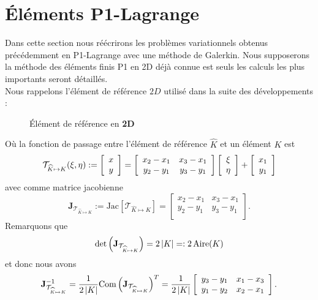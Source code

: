 
\section{Éléments P1-Lagrange}
\noindent Dans cette section nous réécrirons les problèmes variationnels obtenus précédemment en P1-Lagrange avec une méthode de Galerkin. Nous supposerons la méthode des éléments finis P1 en 2D déjà connue est seuls les calculs les plus importants seront détaillés.\\

\noindent Nous rappelons l'élément de référence $2D$ utilisé dans la suite des développements :
\begin{figure}[H]
	\centering
\caption[Élément de référence en \textbf{2D}]{Élément de référence en \textbf{2D}}
\label{fig:elementreference}
\end{figure}
\noindent Où la fonction de passage entre l'élément de référence $\widehat{K}$ et un élément $K$ est
\begin{equation}
	\mathcal{T}_{\widehat{K}\mapsto K} (\xi, \eta) := \left[\begin{array}{c} x\\ y\\  \end{array}\right] =  \left[\begin{array}{cc}
	x_2-x_1 & x_3-x_1\\
	y_2-y_1 & y_3-y_1\\
	\end{array}\right] \left[\begin{array}{c} \xi\\ \eta\\  \end{array}\right] + \left[\begin{array}{c} x_1\\ y_1\\  \end{array}\right]
\end{equation}
avec comme matrice jacobienne
\begin{equation}
	\mathbf{J}_{\mathcal{T}_{\widehat{K}\mapsto K}} := \text{Jac}\left[\mathcal{T}_{\widehat{K}\mapsto K}\right] = \left[\begin{array}{cc}
	x_2-x_1 & x_3-x_1\\
	y_2-y_1 & y_3-y_1\\
	\end{array}\right].
\end{equation}
Remarquons que 
\begin{equation}
	\text{det}\left(\mathbf{J}_{\mathcal{T}_{\widehat{K}\mapsto K}}\right) = 2\left|K\right| =: 2\,\text{Aire} (K)
\end{equation}
et donc nous avons
\begin{equation*}
	\mathbf{J}_{\mathcal{T}_{\widehat{K}\mapsto K}}^{-1}=\frac{1}{2\left|K\right|}\text{Com}\left(\mathbf{J}_{\mathcal{T}_{\widehat{K}\mapsto K}}\right)^{T}=\frac{1}{2\left|K\right|}\left[\begin{array}{cc}
	y_3-y_1 & x_1-x_3\\
	y_1-y_2 & x_2-x_1\\
\end{array}\right].
\end{equation*}
